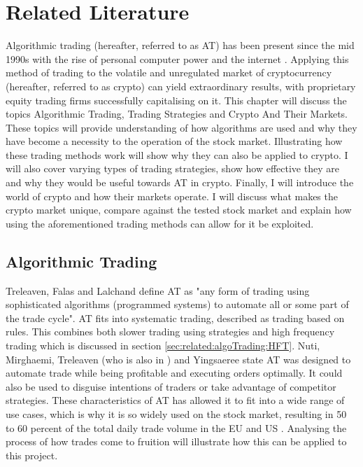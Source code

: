 %
\chapter{Related Literature}
\label{sec:related}
Algorithmic trading (hereafter, referred to as AT) has been present since the mid 1990s with the rise of personal computer power and the internet \cite{WEB:PISANI:2010}. Applying this method of trading to the volatile and unregulated market of cryptocurrency (hereafter, referred to as crypto) can yield extraordinary results, with proprietary equity trading firms successfully capitalising on it. This chapter will discuss the topics Algorithmic Trading, Trading Strategies and Crypto And Their Markets. These topics will provide understanding of how algorithms are used and why they have become a necessity to the operation of the stock market. Illustrating how these trading methods work will show why they can also be applied to crypto. I will also cover varying types of trading strategies, show how effective they are and why they would be useful towards AT in crypto. Finally, I will introduce the world of crypto and how their markets operate. I will discuss what makes the crypto market unique, compare against the tested stock market and explain how using the aforementioned trading methods can allow for it be exploited. 


\section{Algorithmic Trading}
\label{sec:related:algoTrading}
\noindent Treleaven, Falas and Lalchand \cite{ART:Treleaven:2013} define AT as "any form of trading using sophisticated algorithms (programmed systems) to automate all or some part of the trade cycle". AT fits into systematic trading, described as trading based on rules. This combines both slower trading using strategies and high frequency trading which is discussed in section \ref{sec:related:algoTrading:HFT}. Nuti, Mirghaemi, Treleaven (who is also in \cite{ART:Treleaven:2013}) and Yingsaeree \cite{ART:Nuti:2011} state AT was designed to automate trade while being profitable and executing orders optimally. It could also be used to disguise intentions of traders or take advantage of competitor strategies. These characteristics of AT has allowed it to fit into a wide range of use cases, which is why it is so widely used on the stock market, resulting in 50 to 60 percent of the total daily trade volume in the EU and US \cite{ART:Nuti:2011}. Analysing the process of how trades come to fruition will illustrate how this can be applied to this project.

